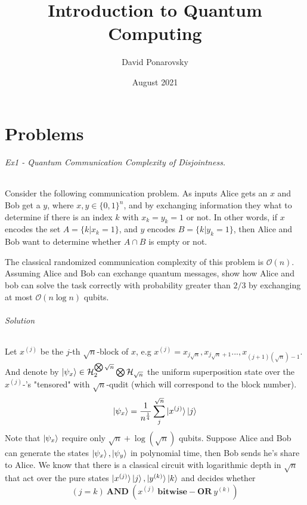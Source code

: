 \documentclass{article}
\title{Introduction to Quantum Computing}
\author{David Ponarovsky}
\date{August 2021}
\newcommand{\onotation}[1]{\(\mathcal{O} \left( {#1}  \right) \)}
\newcommand{\ona}[1]{\onotation{#1}}
\begin{document}
\maketitle

\part{ Problems }

\paragraph{Ex1 - Quantum Communication Complexity of Disjointness.}
Consider the following communication
problem. As inputs Alice gets an \(x\) and Bob get a \(y\), where \(x, y \in \{0, 1\}^n \), and by exchanging information they what to determine if there is an index \(k\) with \(x_k = y_k = 1 \) or not. 
In other words, if \(x\) encodes the
set \(A = \{k | x_k = 1\} \), and \(y\) encodes \(B = \{k | y_k = 1\}\), then Alice and Bob want to determine whether \( A \cap B \) is empty or not.

The classical randomized communication complexity of this problem is \ona{n}.
Assuming Alice and Bob can exchange quantum messages, show how Alice and bob can solve the task
correctly with probability greater than \(2/3\) by exchanging at most \ona{n\log n } qubits.

\paragraph{Solution} Let \( x^{(j)} \) be the \(j\)-th \(\sqrt{n}\)-block of \(x\), e.g \(x^{(j)} = x_{j\sqrt{n}},x_{j\sqrt{n}+1}...,x_{(j+1)(\sqrt{n})-1}  \). And denote by \( \ket{\psi_x} \in \mathcal{H}_{2}^{\bigotimes \sqrt{n}} \bigotimes \mathcal{H}_{\sqrt{n}} \) the uniform superposition state over the \( x^{(j)}\)-'s "tensored" with \(\sqrt{n}\)-qudit (which will correspond to the block number).  \[ \ket{\psi_x} = \frac{1}{n^\frac{1}{4}}\sum_{j}^{\sqrt{n}}\ket{x^{(j)}}\ket{j} \] Note that \( \ket{\psi_x} \) require only \( \sqrt{n} + \log(\sqrt{n}) \) qubits. Suppose Alice and Bob can generate the states \( \ket{\psi_x}, \ket{\psi_y} \) in polynomial time, then Bob sends he's share to Alice. We know that there is a classical circuit with logarithmic depth in \( \sqrt{n} \) that act over the pure states \( \ket{x^{(j)}}\ket{j} , \ket{y^{(k)}}\ket{k} \) and decides whether \[ \left( j =  k \right) \ \mathbf{AND}  \ \left( x^{(j)} \ \mathbf{bitwise-OR} \  y^{(k)} \right)   \]
\end{document}
